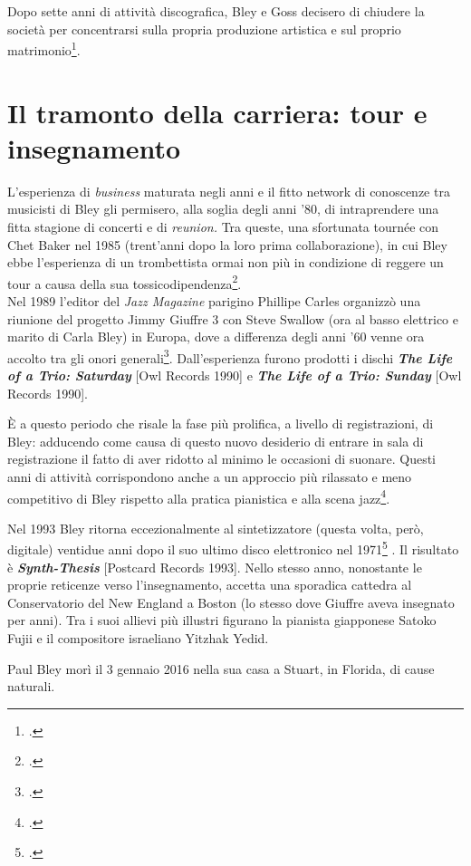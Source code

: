 Dopo sette anni di attività discografica, Bley e Goss decisero di chiudere la società per concentrarsi sulla propria produzione artistica e sul proprio matrimonio\footcite[132]{stopping}.\par
\section{Il tramonto della carriera: tour e insegnamento}
L'esperienza di \textit{business} maturata negli anni e il fitto network di conoscenze tra musicisti di Bley gli permisero, alla soglia degli anni '80, di intraprendere una fitta stagione di concerti e di \textit{reunion.} Tra queste, una sfortunata tournée con Chet Baker nel 1985 (trent'anni dopo la loro prima collaborazione), in cui Bley ebbe l'esperienza di un trombettista ormai non più in condizione di reggere un tour a causa della sua tossicodipendenza\footcite[137]{stopping}. \\
Nel 1989 l'editor del \textit{Jazz Magazine} parigino Phillipe Carles organizzò una riunione del progetto Jimmy Giuffre 3 con Steve Swallow (ora al basso elettrico e marito di Carla Bley) in Europa, dove a differenza degli anni '60 venne ora accolto tra gli onori generali\footcite[137]{stopping}. Dall'esperienza furono prodotti i dischi \textit{\textbf{The Life of a Trio: Saturday}} [Owl Records 1990] e \textit{\textbf{The Life of a Trio: Sunday}} [Owl Records 1990]. \par
È a questo periodo che risale la fase più prolifica, a livello di registrazioni, di Bley: adducendo come causa di questo nuovo desiderio di entrare in sala di registrazione il fatto di aver ridotto al minimo le occasioni di suonare. Questi anni di attività corrispondono anche a un approccio più rilassato e meno competitivo di Bley rispetto alla pratica pianistica e alla scena jazz\footcite[82]{cappelletti}.\par
Nel 1993 Bley ritorna eccezionalmente al sintetizzatore (questa volta, però, digitale) ventidue anni dopo il suo ultimo disco elettronico nel 1971\footcite[148]{stopping}
. Il risultato è \textit{\textbf{Synth-Thesis}} [Postcard Records 1993]. Nello stesso anno, nonostante le proprie reticenze verso l'insegnamento, accetta una sporadica cattedra al Conservatorio del New England a Boston (lo stesso dove Giuffre aveva insegnato per anni). Tra i suoi allievi più illustri figurano la pianista giapponese Satoko Fujii e il compositore israeliano Yitzhak Yedid.\par
Paul Bley morì il 3 gennaio 2016 nella sua casa a Stuart, in Florida, di cause naturali.




\appendix

